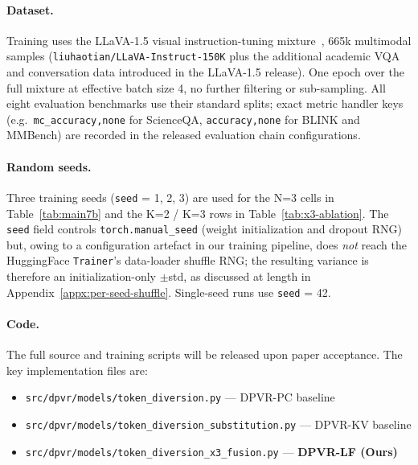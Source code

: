 \documentclass[a4paper,fleqn,review]{cas-sc}
\newcommand{\dpvrlf}{DPVR-LF}
\newcommand{\dpvrpc}{DPVR-PC}
\newcommand{\dpvrkv}{DPVR-KV}
\begin{document}
\paragraph{Dataset.}
Training uses the LLaVA-1.5 visual instruction-tuning
mixture~\citep{liu2024llava15}, 665k multimodal samples
(\texttt{liuhaotian/LLaVA-Instruct-150K} plus the additional
academic VQA and conversation data introduced in the LLaVA-1.5
release). One epoch over the full mixture at effective batch size
4, no further filtering or sub-sampling. All eight evaluation
benchmarks use their standard splits;
exact metric handler keys (e.g.\ \texttt{mc\_accuracy,none} for
ScienceQA, \texttt{accuracy,none} for BLINK and MMBench) are
recorded in the released evaluation chain configurations.

\paragraph{Random seeds.}
Three training seeds (\texttt{seed} = 1, 2, 3) are used for the
N=3 cells in Table~\ref{tab:main7b} and the K=2 / K=3 rows in
Table~\ref{tab:x3-ablation}. The \texttt{seed} field controls
\texttt{torch.manual\_seed} (weight initialization and dropout
RNG) but, owing to a configuration artefact in our training
pipeline, does \emph{not} reach the HuggingFace \texttt{Trainer}'s
data-loader shuffle RNG; the resulting variance is therefore an
initialization-only $\pm$std, as discussed at length in
Appendix~\ref{appx:per-seed-shuffle}. Single-seed runs use
\texttt{seed} = 42.

\paragraph{Code.}
The full source and training scripts will be released upon paper
acceptance. The key implementation files are:
\begin{itemize}
\item \texttt{src/dpvr/models/token\_diversion.py} --- \dpvrpc{} baseline
\item \texttt{src/dpvr/models/token\_diversion\_substitution.py} ---
      \dpvrkv{} baseline
\item \texttt{src/dpvr/models/token\_diversion\_x3\_fusion.py} ---
      \textbf{\dpvrlf{} (Ours)}
\end{itemize}

\end{document}
